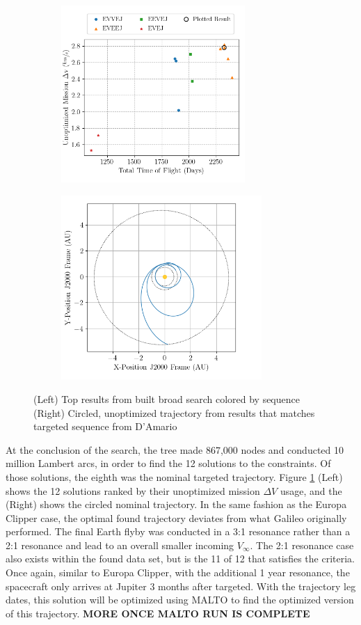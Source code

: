 \documentclass[letterpaper, preprint, paper,11pt]{AAS}	%
\begin{document}
\begin{figure}[htb]
    \begin{subfigure}
        \centering\includegraphics[width=2.75in]{./fig/galileoResults.png}
    \end{subfigure}
    \begin{subfigure}
        \centering\includegraphics[width=3in]{./fig/galileoMCTS.png}
    \end{subfigure}
    \caption{(Left) Top results from built broad search colored by sequence\hspace{1em} (Right) Circled, unoptimized trajectory from results that matches targeted sequence from D'Amario \cite{DAmario1992}}
    \label{fig:galiResults}
\end{figure}

At the conclusion of the search, the tree made 867,000 nodes and conducted 10 million Lambert arcs, in order to find the 12 solutions to the constraints. Of those solutions, the eighth was the nominal targeted trajectory. Figure \ref*{fig:galiResults} (Left) shows the 12 solutions ranked by their unoptimized mission $\Delta V$ usage, and the (Right) shows the circled nominal trajectory. In the same fashion as the Europa Clipper case, the optimal found trajectory deviates from what Galileo originally performed. The final Earth flyby was conducted in a 3:1 resonance rather than a 2:1 resonance and lead to an overall smaller incoming $V_\infty$. The 2:1 resonance case also exists within the found data set, but is the 11 of 12 that satisfies the criteria. Once again, similar to Europa Clipper, with the additional 1 year resonance, the spacecraft only arrives at Jupiter 3 months after targeted. With the trajectory leg dates, this solution will be optimized using MALTO to find the optimized version of this trajectory. \textbf{MORE ONCE MALTO RUN IS COMPLETE}
\end{document}
